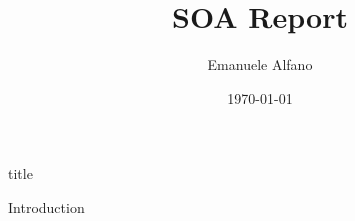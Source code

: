 \documentclass[a4paper,10pt]{article}
\title{SOA Report}
\author{Emanuele Alfano}
\date{\today}
\begin{document}

{title}

\frontmatter

\tableofcontents

\listoffigures
\listoftables

\mainmatter


{Introduction}


\newpage
\printbibliography[heading = bibintoc]    %
\end{document}
